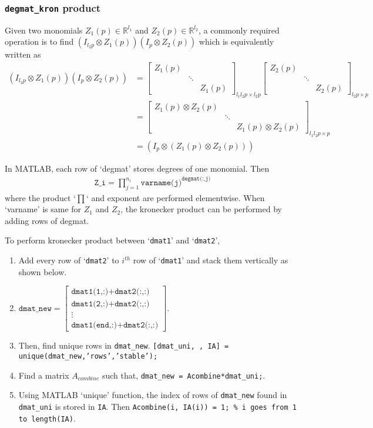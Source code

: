 \documentclass{article}
\newcommand{\bmat}[1]{\begin{bmatrix} #1\end{bmatrix}}
\newcommand{\R}{\mathbb{R}}
\begin{document}
	\subsubsection{\texttt{degmat\_kron} product} \label{subsec:degkron}
	Given two monomials $Z_1(p)\in \R^{l_1}$ and $Z_2(p)\in\R^{l_2}$, a commonly required operation is to find $(I_{l_2p}\otimes Z_1(p))(I_{p}\otimes Z_2(p))$ which is equivalently written as
	\begin{align*}
		(I_{l_2p}\otimes Z_1(p))(I_{p}\otimes Z_2(p)) &= \bmat{Z_1(p)&&\\&\ddots&\\&&Z_1(p)}_{l_1l_2p\times l_2p}\bmat{Z_2(p)&&\\&\ddots&\\&&Z_2(p)}_{l_2p\times p}\\
		&=\bmat{Z_1(p)\otimes Z_2(p)&&\\&\ddots&\\&&Z_1(p)\otimes Z_2(p)}_{l_1l_2p\times p}\\
		&=(I_{p}\otimes (Z_1(p)\otimes Z_2(p)))
	\end{align*}
	
	In MATLAB, each row of `degmat' stores degrees of one monomial. Then
	\begin{align*}
	\texttt{Z\_i} = \prod_{j=1}^{n_i} \texttt{varname(j)}^\texttt{{degmat(:,j)}}
	\end{align*}
	where the product `$\prod$` and exponent are performed elementwise.
	When `varname' is same for $Z_1$ and $Z_2$, the kronecker product can be performed by adding rows of degmat.
	
	To perform kronecker product between `\texttt{dmat1}' and `\texttt{dmat2}',
	\begin{enumerate}
		\item Add every row of `\texttt{dmat2}' to $i^{th}$ row of `\texttt{dmat1}' and stack them vertically as shown below.
		\item $\texttt{dmat\_new} = \bmat{\texttt{dmat1(1,:)}+\texttt{dmat2(:,:)}\\\texttt{dmat1(2,:)}+\texttt{dmat2(:,:)}\\\vdots\\\texttt{dmat1(end,:)}+\texttt{dmat2(:,:)}}$.
		\item Then, find unique rows in \texttt{dmat\_new}.
		\texttt{[dmat\_uni, \texttildelow, IA] = unique(dmat\_new,'rows','stable');}
		\item Find a matrix $A_{combine}$ such that, \texttt{dmat\_new = Acombine*dmat\_uni;}.
		\item Using MATLAB `unique' function, the index of rows of \texttt{dmat\_new} found in \texttt{dmat\_uni} is stored in \texttt{IA}. Then \texttt{Acombine(i, IA(i)) = 1; \% i goes from 1 to length(IA)}.
	\end{enumerate}
	
\end{document}
